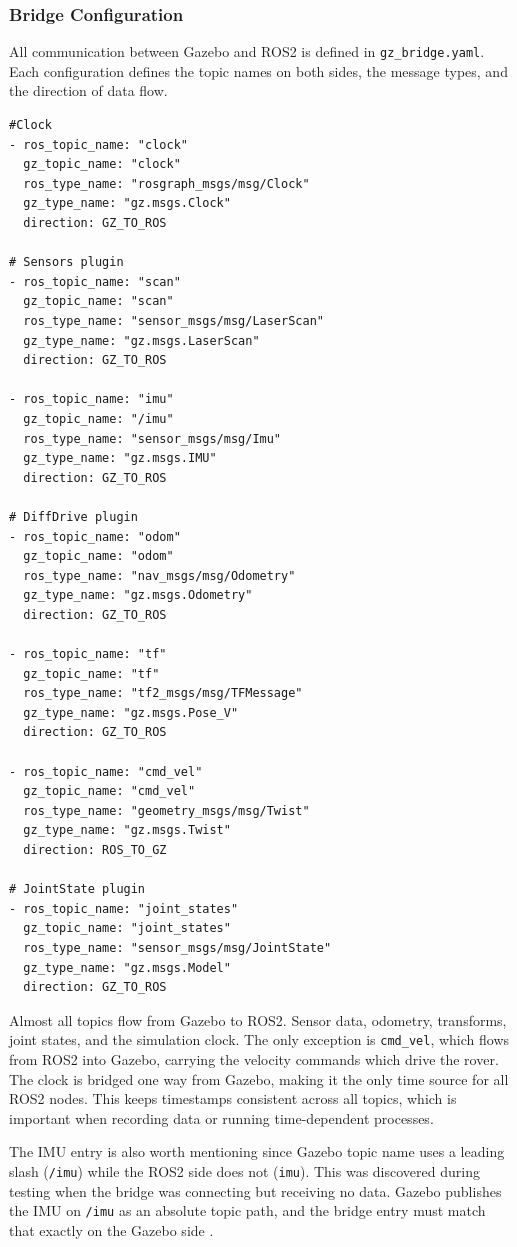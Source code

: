 \subsubsection{Bridge Configuration}

All communication between Gazebo and ROS2 is defined in \texttt{gz\_bridge.yaml}. Each configuration defines the topic names on both sides, the message types, and the direction of data flow.

\begin{lstlisting}[language=XML, caption={Gazebo bridge in YAML}]
#Clock
- ros_topic_name: "clock"
  gz_topic_name: "clock"
  ros_type_name: "rosgraph_msgs/msg/Clock"
  gz_type_name: "gz.msgs.Clock"
  direction: GZ_TO_ROS

# Sensors plugin
- ros_topic_name: "scan"
  gz_topic_name: "scan"
  ros_type_name: "sensor_msgs/msg/LaserScan"
  gz_type_name: "gz.msgs.LaserScan"
  direction: GZ_TO_ROS

- ros_topic_name: "imu"
  gz_topic_name: "/imu"
  ros_type_name: "sensor_msgs/msg/Imu"
  gz_type_name: "gz.msgs.IMU"
  direction: GZ_TO_ROS

# DiffDrive plugin
- ros_topic_name: "odom"
  gz_topic_name: "odom"
  ros_type_name: "nav_msgs/msg/Odometry"
  gz_type_name: "gz.msgs.Odometry"
  direction: GZ_TO_ROS

- ros_topic_name: "tf"
  gz_topic_name: "tf"
  ros_type_name: "tf2_msgs/msg/TFMessage"
  gz_type_name: "gz.msgs.Pose_V"
  direction: GZ_TO_ROS

- ros_topic_name: "cmd_vel"
  gz_topic_name: "cmd_vel"
  ros_type_name: "geometry_msgs/msg/Twist"
  gz_type_name: "gz.msgs.Twist"
  direction: ROS_TO_GZ

# JointState plugin
- ros_topic_name: "joint_states"
  gz_topic_name: "joint_states"
  ros_type_name: "sensor_msgs/msg/JointState"
  gz_type_name: "gz.msgs.Model"
  direction: GZ_TO_ROS
\end{lstlisting}

Almost all topics flow from Gazebo to ROS2. Sensor data, odometry, transforms, joint states, and the simulation clock. The only exception is \texttt{cmd\_vel}, which flows from ROS2 into Gazebo, carrying the velocity commands which drive the rover. The clock is bridged one way from Gazebo,  making it the only time source for all ROS2 nodes. This keeps timestamps consistent across all topics, which is important when recording data or running time-dependent processes.

The IMU entry is also worth mentioning since Gazebo topic name uses a leading slash (\texttt{/imu}) while the ROS2 side does not (\texttt{imu}). This was discovered during testing when the bridge was connecting but receiving no data. Gazebo publishes the IMU on \texttt{/imu} as an absolute topic path, and the bridge entry must match that exactly on the Gazebo side \cite{openrobotics2024}.

